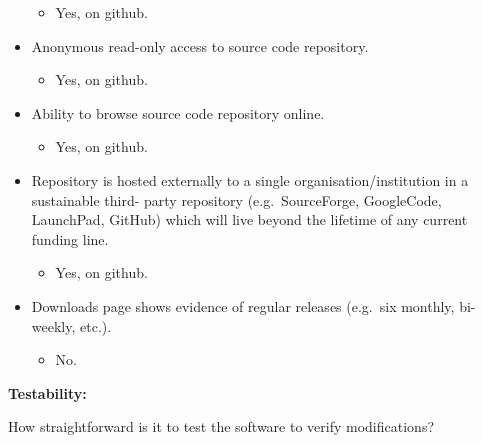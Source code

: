 \begin{itemize}
  \begin{itemize}
  \itemsep1pt\parskip0pt
  \item
    Yes, on github.
  \end{itemize}
\item
  Anonymous read-only access to source code repository.

  \begin{itemize}
  \itemsep1pt\parskip0pt
  \item
    Yes, on github.
  \end{itemize}
\item
  Ability to browse source code repository online.

  \begin{itemize}
  \itemsep1pt\parskip0pt
  \item
    Yes, on github.
  \end{itemize}
\item
  Repository is hosted externally to a single organisation/institution
  in a sustainable third- party repository (e.g.~SourceForge,
  GoogleCode, LaunchPad, GitHub) which will live beyond the lifetime of
  any current funding line.

  \begin{itemize}
  \itemsep1pt\parskip0pt
  \item
    Yes, on github.
  \end{itemize}
\item
  Downloads page shows evidence of regular releases (e.g.~six monthly,
  bi-weekly, etc.).

  \begin{itemize}
  \itemsep1pt\parskip0pt
  \item
    No.
  \end{itemize}
\end{itemize}

\textbf{Testability:}

How straightforward is it to test the software to verify modifications?

